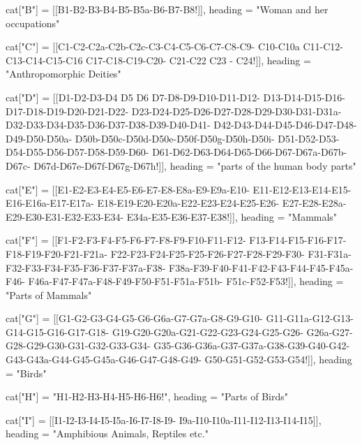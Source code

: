 \documentclass{article}
\begin{document}
\begin{luacode*}
cat["B"]   =   {[[B1-B2-B3-B4-B5-B5a-B6-B7-B8!]], 
                 heading = "Woman and her occupations"}

cat["C"]   =   {[[C1-C2-C2a-C2b-C2c-C3-C4-C5-C6-C7-C8-C9-
                 C10-C10a 
                 C11-C12-C13-C14-C15-C16 C17-C18-C19-C20-
                 C21-C22  C23 - C24!]], 
                 heading = "Anthropomorphic Deities"}

cat["D"]   =   {[[D1-D2-D3-D4 D5 D6 D7-D8-D9-D10-D11-D12-
                 D13-D14-D15-D16-D17-D18-D19-D20-D21-D22-
                 D23-D24-D25-D26-D27-D28-D29-D30-D31-D31a-
                 D32-D33-D34-D35-D36-D37-D38-D39-D40-D41-
                 D42-D43-D44-D45-D46-D47-D48-D49-D50-D50a-
                 D50b-D50c-D50d-D50e-D50f-D50g-D50h-D50i-
                 D51-D52-D53-D54-D55-D56-D57-D58-D59-D60-
                 D61-D62-D63-D64-D65-D66-D67-D67a-D67b-D67c-
                 D67d-D67e-D67f-D67g-D67h!]],
                 heading = "parts of the human body parts"}


cat["E"]   =   {[[E1-E2-E3-E4-E5-E6-E7-E8-E8a-E9-E9a-E10-
                 E11-E12-E13-E14-E15-E16-E16a-E17-E17a-
                 E18-E19-E20-E20a-E22-E23-E24-E25-E26-
                 E27-E28-E28a-E29-E30-E31-E32-E33-E34-
                 E34a-E35-E36-E37-E38!]],
                 heading = "Mammals"}

cat["F"]   =   {[[F1-F2-F3-F4-F5-F6-F7-F8-F9-F10-F11-F12-
                  F13-F14-F15-F16-F17-F18-F19-F20-F21-F21a-
                  F22-F23-F24-F25-F25-F26-F27-F28-F29-F30-
                  F31-F31a-F32-F33-F34-F35-F36-F37-F37a-F38-
                  F38a-F39-F40-F41-F42-F43-F44-F45-F45a-F46-
                  F46a-F47-F47a-F48-F49-F50-F51-F51a-F51b-
                  F51c-F52-F53!]],
                heading = "Parts of Mammals"}

cat["G"]  =   {[[G1-G2-G3-G4-G5-G6-G6a-G7-G7a-G8-G9-G10-
                 G11-G11a-G12-G13-G14-G15-G16-G17-G18-
                 G19-G20-G20a-G21-G22-G23-G24-G25-G26-
                 G26a-G27-G28-G29-G30-G31-G32-G33-G34-
                 G35-G36-G36a-G37-G37a-G38-G39-G40-G42-
                 G43-G43a-G44-G45-G45a-G46-G47-G48-G49-
                 G50-G51-G52-G53-G54!]],
                heading = "Birds"}

cat["H"] 	 =   {"H1-H2-H3-H4-H5-H6-H6!",
                heading = "Parts of Birds"}

cat["I"] 	 =   {[[I1-I2-I3-I4-I5-I5a-I6-I7-I8-I9-
                 I9a-I10-I10a-I11-I12-I13-I14-I15]],
                 heading = "Amphibious Animals, Reptiles etc."}


\end{luacode*}
\end{document}
